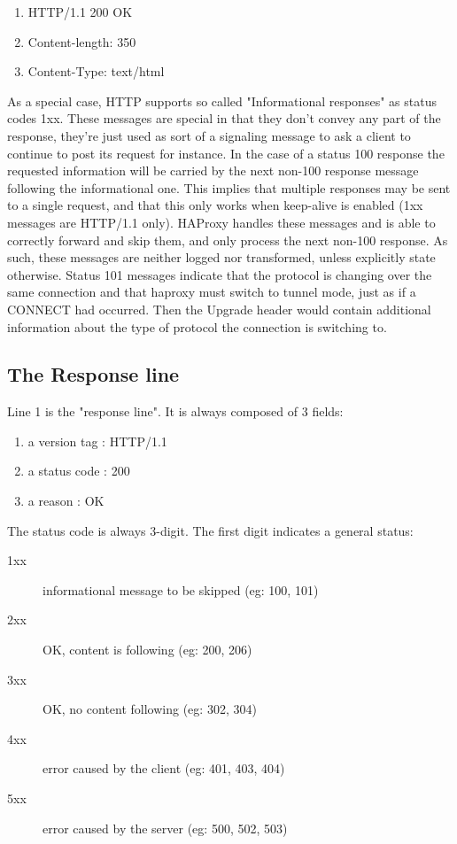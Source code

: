 \begin{enumerate}
   \item HTTP/1.1 200 OK
   \item Content-length: 350
   \item Content-Type: text/html
\end{enumerate}

As a special case, HTTP supports so called "Informational responses" as status
codes 1xx. These messages are special in that they don't convey any part of the
response, they're just used as sort of a signaling message to ask a client to
continue to post its request for instance. In the case of a status 100 response
the requested information will be carried by the next non-100 response message
following the informational one. This implies that multiple responses may be
sent to a single request, and that this only works when keep-alive is enabled
(1xx messages are HTTP/1.1 only). HAProxy handles these messages and is able to
correctly forward and skip them, and only process the next non-100 response. As
such, these messages are neither logged nor transformed, unless explicitly
state otherwise. Status 101 messages indicate that the protocol is changing
over the same connection and that haproxy must switch to tunnel mode, just as
if a CONNECT had occurred. Then the Upgrade header would contain additional
information about the type of protocol the connection is switching to.

\subsection{The Response line}
Line 1 is the "response line". It is always composed of 3 fields:

\begin{enumerate}
  \item a version tag : HTTP/1.1
  \item a status code : 200
  \item a reason      : OK
\end{enumerate}

The status code is always 3-digit. The first digit indicates a general status:

\begin{description}
  \item[1xx] informational message to be skipped (eg: 100, 101)
  \item[2xx] OK, content is following   (eg: 200, 206)
  \item[3xx] OK, no content following   (eg: 302, 304)
  \item[4xx] error caused by the client (eg: 401, 403, 404)
  \item[5xx] error caused by the server (eg: 500, 502, 503)
\end{description}

